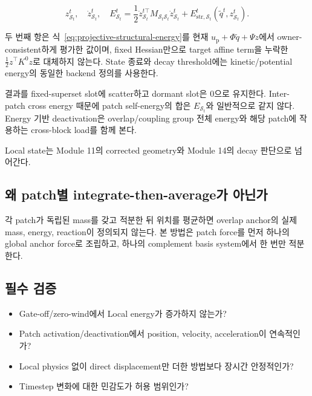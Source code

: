 \documentclass[11pt,a4paper]{article}
\begin{document}
\begin{equation}
  z_{\mathcal S_t}^t,\quad\dot z_{\mathcal S_t}^t,\quad
  E_{\mathcal S_t}^t
  =
  \frac12\dot z_{\mathcal S_t}^{t\top}
  M_{\mathcal S_t\mathcal S_t}\dot z_{\mathcal S_t}^t
  +E_{\mathrm{str},\mathcal S_t}^t
  (\widetilde q^t,z_{\mathcal S_t}^t).
\end{equation}

두 번째 항은 식~\eqref{eq:projective-structural-energy}를 현재
\(u_{\mathrm p}+\Phi\widetilde q+\Psi z\)에서 owner-consistent하게 평가한 값이며,
fixed Hessian만으로 target affine term을 누락한 \(\tfrac12z^\top K^0z\)로 대체하지 않는다.
State 종료와 decay threshold에는 kinetic/potential energy의 동일한 backend 정의를 사용한다.

결과를 fixed-superset slot에 scatter하고 dormant slot은 0으로 유지한다.
Inter-patch cross energy 때문에 patch self-energy의 합은 \(E_{\mathcal S_t}\)와 일반적으로 같지 않다.
Energy 기반 deactivation은 overlap/coupling group 전체 energy와 해당 patch에 작용하는 cross-block load를 함께 본다.

Local state는 Module 11의 corrected geometry와 Module 14의 decay 판단으로 넘어간다.

\subsection*{왜 patch별 integrate-then-average가 아닌가}

각 patch가 독립된 mass를 갖고 적분한 뒤 위치를 평균하면
overlap anchor의 실제 mass, energy, reaction이 정의되지 않는다.
본 방법은 patch force를 먼저 하나의 global anchor force로 조립하고,
하나의 complement basis system에서 한 번만 적분한다.

\subsection*{필수 검증}

\begin{itemize}[leftmargin=1.5em]
  \item Gate-off/zero-wind에서 Local energy가 증가하지 않는가?
  \item Patch activation/deactivation에서 position, velocity, acceleration이 연속적인가?
  \item Local physics 없이 direct displacement만 더한 방법보다 장시간 안정적인가?
  \item Timestep 변화에 대한 민감도가 허용 범위인가?
\end{itemize}
\end{document}
